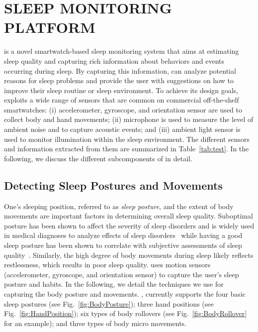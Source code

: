 \section{{\systemname} SLEEP MONITORING PLATFORM}\label{Sec:2design}

{\systemname} is a novel smartwatch-based sleep monitoring system that aims at estimating sleep quality and capturing rich information about behaviors and events occurring during sleep. By capturing this information, {\systemname} can analyze potential reasons for sleep problems and provide the user with suggestions on how to improve their sleep routine or sleep environment. To achieve its design goals, {\systemname} exploits a wide range of sensors that are common on commercial off-the-shelf smartwatches: (i) accelerometer, gyroscope, and orientation sensor are used to collect body and hand movements; (ii) microphone is used to measure the level of ambient noise and to capture acoustic events; and (iii) ambient light sensor is used to monitor illumination within the sleep environment. The different sensors and information extracted from them are summarized in Table~\ref{tab:test}. In the following, we discuss the different subcomponents of {\systemname} in detail.


\subsection{Detecting Sleep Postures and Movements}

One's sleeping position, referred to as {\em sleep posture}, and the extent of body movements are important factors in determining overall
sleep quality. Suboptimal posture has been shown to affect the severity of sleep disorders and is widely used in medical diagnoses to
analyze effects of sleep disorders~\cite{oksenberg1998effect,eiseman2012impact} while having a good sleep posture has been shown to
correlate with subjective assessments of sleep quality~\cite{dekoninck83sleep}. Similarly, the high degree of body movements during sleep
likely reflects restlessness, which results in poor sleep quality. {\systemname} uses motion sensors (accelerometer, gyroscope, and
orientation sensor) to capture the user's sleep posture and habits. In the following, we detail the techniques we use for capturing the
body posture and movements.  {\systemname}, currently supports the four basic sleep postures (see Fig.~\ref{fig:BodyPosture}); three hand
positions (see Fig.~\ref{fig:HandPosition}); six types of body rollovers (see Fig.~\ref{fig:BodyRollover} for an example); and three types
of body micro movements.

